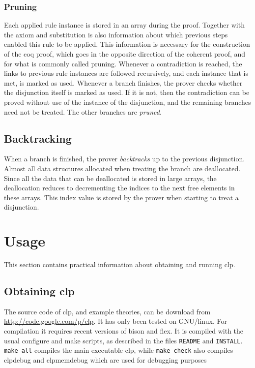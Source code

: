 \documentclass[a4paper]{article}
\begin{document}
\subsubsection{Pruning}
Each applied rule instance is stored in an array during the proof. Together with the axiom and substitution is also information about which previous steps enabled this rule to be applied. This information is necessary for the construction of the coq proof, which goes in the opposite direction of the coherent proof, and for what is commonly called pruning. Whenever a contradiction is reached, the links to previous rule instances are followed recursively, and each instance that is met, is marked as used. Whenever a branch finishes, the prover checks whether the disjunction itself is marked as used. If it is not, then the contradiction can be proved without use of the instance of the disjunction, and the remaining branches need not be treated. The other branches are \emph{pruned}.

\subsection{Backtracking}
When a branch is finished, the prover \emph{backtracks} up to the previous disjunction. Almost all data structures allocated when treating the branch are deallocated. Since all the data that can be deallocated is stored in large arrays, the deallocation reduces to decrementing the indices to the next free elements in these arrays. This index value is stored by the prover when starting to treat a disjunction.

\section{Usage}
This section contains practical information about obtaining and running clp.
\subsection{Obtaining clp}
The source code of clp, and example theories, can be download from \url{http://code.google.com/p/clp}. It has only been tested on GNU/linux. For compilation it requires recent versions of bison and flex. It is compiled with the usual configure and make scripts, as described in the files \verb|README| and \verb|INSTALL|. \verb|make all| compiles the main executable clp, while \verb|make check| also compiles clpdebug and clpmemdebug which are used for debugging purposes
\end{document}
